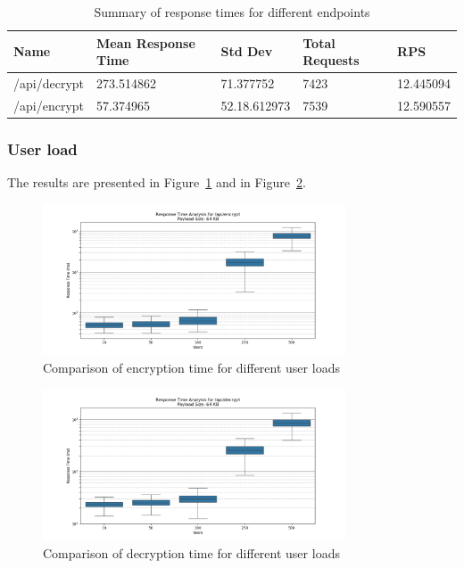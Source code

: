 \documentclass[cic,tc,english]{iiufrgs}
\begin{document}
                \begin{table}[!ht]
                    \centering
                    \begin{tabular}{|l|l|l|l|l|}
                    \hline
                        Name & Mean Response Time &  Std Dev & Total Requests & RPS \\ \hline
                        /api/decrypt & 273.514862 & 71.377752 & 7423 & 12.445094 \\ \hline
                        /api/encrypt & 57.374965 & 52.18.612973 & 7539 & 12.590557 \\ \hline
                    \end{tabular}
                    \caption{Summary of response times for different endpoints}
                    \label{tab:response_times}
                \end{table}

            \subsubsection{User load}
                The results are presented in Figure~\ref{fig:encrypt_user_load} and in Figure~\ref{fig:decrypt_user_load}.

                \begin{figure}
                    \centering
                    \includegraphics[width=0.8\textwidth]{images/phase3/response_time_api_encrypt_64KB.png}
                    \caption{Comparison of encryption time for different user loads}
                    \label{fig:encrypt_user_load}
                \end{figure}

                \begin{figure}
                    \centering
                    \includegraphics[width=0.8\textwidth]{images/phase3/response_time_api_decrypt_64KB.png}
                    \caption{Comparison of decryption time for different user loads}
                    \label{fig:decrypt_user_load}
                \end{figure}
\end{document}
